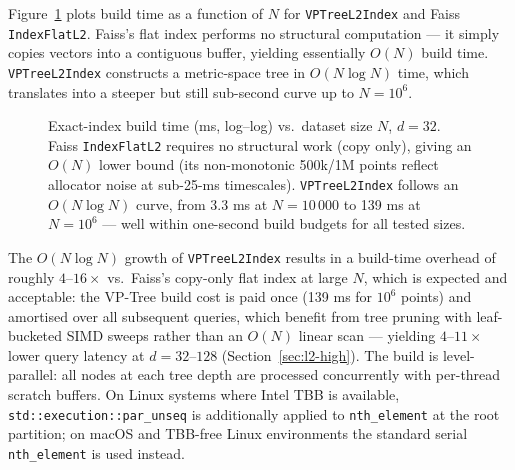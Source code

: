\documentclass[11pt,a4paper]{article}
\begin{document}
Figure~\ref{fig:build-exact} plots build time as a function of $N$ for
\texttt{VPTreeL2Index} and Faiss \texttt{IndexFlatL2}.  Faiss's flat index
performs no structural computation — it simply copies vectors into a
contiguous buffer, yielding essentially $O(N)$ build time.
\texttt{VPTreeL2Index} constructs a metric-space tree in $O(N \log N)$ time,
which translates into a steeper but still sub-second curve up to $N = 10^6$.

\begin{figure}[h]
\centering
{}
\caption{Exact-index build time (ms, log--log) vs.\ dataset size $N$, $d=32$.
  Faiss \texttt{IndexFlatL2} requires no structural work (copy only), giving
  an $O(N)$ lower bound (its non-monotonic 500k/1M points reflect allocator
  noise at sub-25-ms timescales).  \texttt{VPTreeL2Index} follows an
  $O(N \log N)$ curve, from 3.3 ms at $N=10\,000$ to 139 ms at $N=10^6$ —
  well within one-second build budgets for all tested sizes.}
\label{fig:build-exact}
\end{figure}

The $O(N \log N)$ growth of \texttt{VPTreeL2Index} results in a build-time
overhead of roughly $4\text{--}16\times$ vs.\ Faiss's copy-only flat index
at large $N$, which is expected and acceptable: the VP-Tree build cost is
paid once (139 ms for $10^6$ points) and amortised over all subsequent
queries, which benefit from tree pruning with leaf-bucketed SIMD sweeps
rather than an $O(N)$ linear scan — yielding $4\text{--}11\times$ lower
query latency at $d=32\text{--}128$ (Section~\ref{sec:l2-high}).
The build is level-parallel: all nodes at each tree depth are processed
concurrently with per-thread scratch buffers.  On Linux systems where Intel
TBB is available, \texttt{std::execution::par\_unseq} is additionally
applied to \texttt{nth\_element} at the root partition; on macOS and
TBB-free Linux environments the standard serial \texttt{nth\_element} is
used instead.
\end{document}
